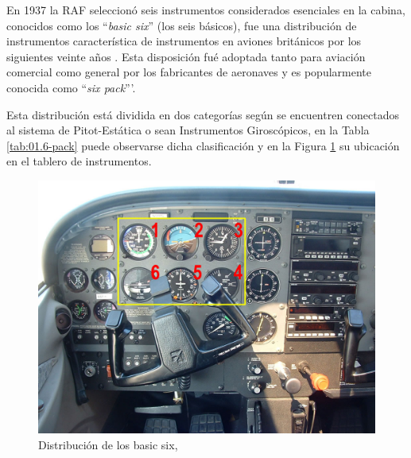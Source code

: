En 1937 la \ac{RAF} seleccion\'o seis instrumentos considerados esenciales en la cabina, conocidos como los ``\emph{basic six}'' (los seis b\'asicos), fue una distribuci\'on de instrumentos caracter\'istica de instrumentos en aviones brit\'anicos por los siguientes veinte a\~nos \cite{RAF_37}. Esta disposici\'on fu\'e adoptada tanto para aviaci\'on comercial como general por los fabricantes de aeronaves y es popularmente conocida como ``\emph{six pack}'''.
 
Esta distribuci\'on est\'a dividida en dos categor\'ias seg\'un se encuentren conectados al sistema de Pitot-Est\'atica o sean  Instrumentos Girosc\'opicos, en la Tabla \ref{tab:01.6-pack} puede observarse dicha clasificaci\'on y en la Figura \ref{fig:01-6-pack} su ubicaci\'on en el tablero de instrumentos.

\begin{figure}[!htb]
  \centering
  \includegraphics[width=0.8\linewidth]{01.tablero.instrumentos/imagenes/1.3.distribucion.normalizada.instrumental.en.tablero/01-Cessna-172-Instrument-Panel.jpg}
  \caption{Distribuci\'on de los basic six, \protect\cite{6-pack}}
  \label{fig:01-6-pack}
\end{figure}


